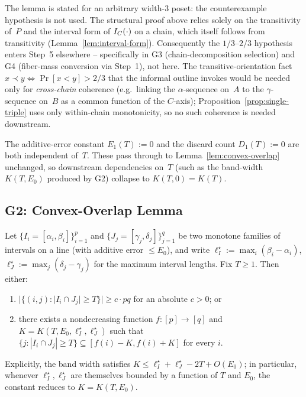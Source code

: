 \begin{remark}\label{rem:G1-counterexample}
The lemma is stated for an arbitrary width-3 poset: the counterexample
hypothesis is not used. The structural proof above relies solely on the
transitivity of~$P$ and the interval form of $I_C(\cdot)$ on a chain, which
itself follows from transitivity (Lemma~\ref{lem:interval-form}). Consequently
the $1/3$--$2/3$ hypothesis enters Step~5 elsewhere -- specifically in
G3 (chain-decomposition selection) and G4 (fiber-mass conversion via Step~1),
not here. The transitive-orientation fact
$x \prec y \iff \Pr[x<y] > 2/3$ that the informal outline invokes would be
needed only for \emph{cross-chain} coherence (e.g.\ linking the
$\alpha$-sequence on~$A$ to the $\gamma$-sequence on~$B$ as a common function
of the $C$-axis); Proposition~\ref{prop:single-triple} uses only within-chain
monotonicity, so no such coherence is needed downstream.
\end{remark}

\begin{remark}\label{rem:G1-constants}
The additive-error constant $E_1(T) := 0$ and the discard count $D_1(T) := 0$
are both independent of~$T$. These pass through to Lemma~\ref{lem:convex-overlap}
unchanged, so downstream dependencies on~$T$ (such as the band-width $K(T, E_0)$
produced by G2) collapse to $K(T, 0) = K(T)$.
\end{remark}

\subsection{G2: Convex-Overlap Lemma}\label{subsec:G2}

\begin{lemma}\label{lem:convex-overlap}
Let $\{I_i = [\alpha_i, \beta_i]\}_{i=1}^p$ and $\{J_j = [\gamma_j, \delta_j]\}_{j=1}^q$
be two monotone families of intervals on a line (with additive error $\le E_0$),
and write $\ell_I^\star := \max_i(\beta_i-\alpha_i)$,
$\ell_J^\star := \max_j(\delta_j-\gamma_j)$ for the maximum interval lengths.
Fix $T \ge 1$. Then either:
\begin{enumerate}[label=(\alph*)]
  \item $|\{(i,j) : |I_i \cap J_j| \ge T\}| \ge c\cdot pq$ for an absolute $c > 0$; or
  \item there exists a nondecreasing function $f : [p] \to [q]$ and
    $K = K(T, E_0, \ell_I^\star, \ell_J^\star)$ such that
    $\{j : |I_i \cap J_j| \ge T\} \subseteq [f(i) - K, f(i) + K]$ for every $i$.
\end{enumerate}
Explicitly, the band width satisfies $K \le \ell_I^\star + \ell_J^\star - 2T + O(E_0)$;
in particular, whenever $\ell_I^\star,\ell_J^\star$ are themselves bounded by a function
of $T$ and $E_0$, the constant reduces to $K = K(T, E_0)$.
\end{lemma}

